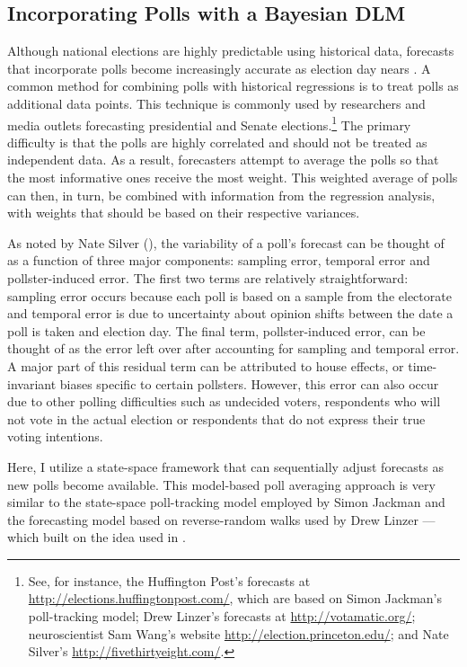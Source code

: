 \documentclass[12pt,final,fleqn]{article}
\theoremstyle{plain}
\begin{document}
\subsection{Incorporating Polls with a Bayesian DLM}
Although national elections are highly predictable using historical data, forecasts that incorporate polls become increasingly accurate as election day nears \citep{linzer2013dynamic}. A common method for combining polls with historical regressions is to treat polls as additional data points. This technique is commonly used by researchers and media outlets forecasting presidential and Senate elections.\footnote{See, for instance, the Huffington Post's forecasts at \url{http://elections.huffingtonpost.com/}, which are based on Simon Jackman's poll-tracking model; Drew Linzer's forecasts at \url{http://votamatic.org/}; neuroscientist Sam Wang's website \url{http://election.princeton.edu/}; and Nate Silver's \url{http://fivethirtyeight.com/}.} The primary difficulty is that the polls are highly correlated and should not be treated as independent data. As a result, forecasters attempt to average the polls so that the most informative ones receive the most weight. This weighted average of polls can then, in turn, be combined with information from the regression analysis, with weights that should be based on their respective variances.

As noted by Nate Silver (\citeyear{silver2014ratings}), the variability of a poll's forecast can be thought of as a function of three major components: sampling error, temporal error and pollster-induced error. The first two terms are relatively straightforward: sampling error occurs because each poll is based on a sample from the electorate and temporal error is due to uncertainty about opinion shifts between the date a poll is taken and election day. The final term, pollster-induced error, can be thought of as the error left over after accounting for sampling and temporal error. A major part of this residual term can be attributed to house effects, or time-invariant biases specific to certain pollsters. However, this error can also occur due to other polling difficulties such as undecided voters, respondents who will not vote in the actual election or respondents that do not express their true voting intentions.

Here, I utilize a state-space framework that can sequentially adjust forecasts as new polls become available. This model-based poll averaging approach is very similar to the state-space poll-tracking model employed by Simon Jackman \citep{jackman2005pooling, jackman2009bayesian} and the forecasting model based on reverse-random walks used by Drew Linzer \citep{linzer2013dynamic}---which built on the idea used in \citet{strauss2007florida}. 
\end{document}
